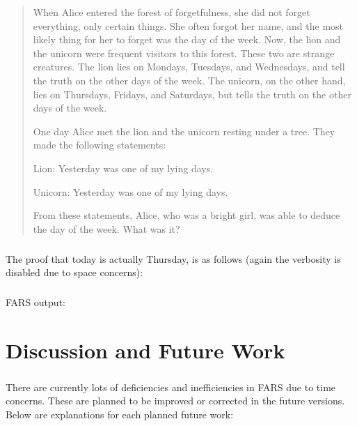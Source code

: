 \documentclass[11pt]{report}
\begin{document}
\begin{quote}
 When Alice entered the forest of forgetfulness, she did not forget everything, only certain things. She often forgot her name, and the most likely thing for her to forget was the day of the week. Now, the lion and the unicorn were frequent visitors to this forest. These two are strange creatures. The lion lies on Mondays, Tuesdays, and Wednesdays, and tell the truth on the other days of the week. The unicorn, on the other hand, lies on Thursdays, Fridays, and Saturdays, but tells the truth on the other days of the week.

One day Alice met the lion and the unicorn resting under a tree.  They made the following statements:

Lion:  Yesterday was one of my lying days.

Unicorn:  Yesterday was one of my lying days.

From these statements, Alice, who was a bright girl, was able to deduce the day of the week.  What was it?
\end{quote}


\paragraph{} The proof that today is actually Thursday, is as follows (again the verbosity is disabled due to space concerns):

\lstset{
xleftmargin=-55pt
}



\paragraph{} FARS output:




\chapter{Discussion and Future Work}

\paragraph{} There are currently lots of deficiencies and inefficiencies in FARS due to time concerns. These are planned to be improved or corrected in the future versions. Below are explanations for each planned future work:
\end{document}
